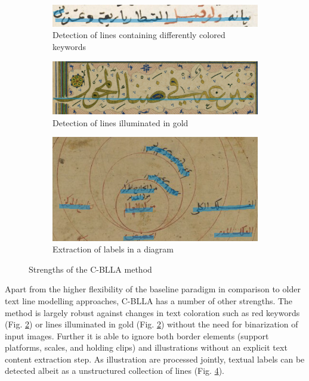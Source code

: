 \begin{figure}[ht!]
	\centering
	\begin{subfigure}[t]{\columnwidth}
		\includegraphics[width=\textwidth]{cor_color.jpg}
		\caption{Detection of lines containing differently colored keywords}
		\label{fig:cor_color}
	\end{subfigure}
	\begin{subfigure}[t]{\columnwidth}
		\includegraphics[width=\textwidth]{cor_color_gold.jpg}
		\caption{Detection of lines illuminated in gold}
		\label{fig:cor_color_gold}
	\end{subfigure}
	\begin{subfigure}[b]{\columnwidth}
		\includegraphics[width=\textwidth]{cor_diagram.jpg}
		\caption{Extraction of labels in a diagram}
		\label{fig:cor_labels}
	\end{subfigure}
	\caption{Strengths of the C-BLLA method}
\end{figure}

Apart from the higher flexibility of the baseline paradigm in comparison to
older text line modelling approaches, C-BLLA has a number of other strengths.
The method is largely robust against changes in text coloration such as red
keywords (Fig. \ref{fig:cor_color_gold}) or lines illuminated in gold (Fig.
\ref{fig:cor_color_gold}) without the need for binarization of input images.
Further it is able to ignore both border elements (support platforms, scales,
and holding clips) and illustrations without an explicit text content
extraction step. As illustration are processed jointly, textual labels can be
detected albeit as a unstructured collection of lines (Fig.
\ref{fig:cor_labels}).

